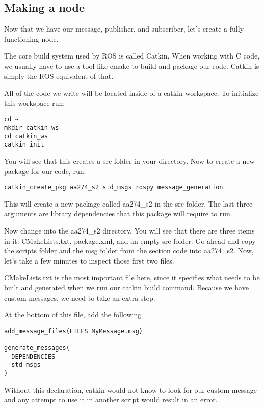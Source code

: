 
\subsection{Making a node}
Now that we have our message, publisher, and subscriber, let's create a fully functioning node.

The core build system used by ROS is called Catkin. When working with C code, we usually have to use a tool like cmake to build and package our code. Catkin is simply the ROS equivalent of that. 

All of the code we write will be located inside of a catkin workspace. To initialize this workspace run:

\begin{lstlisting}
cd ~
mkdir catkin_ws 
cd catkin_ws
catkin init
\end{lstlisting}
You will see that this creates a src folder in your directory. Now to create a new package for our code, run:

\begin{lstlisting}
catkin_create_pkg aa274_s2 std_msgs rospy message_generation
\end{lstlisting}

This will create a new package called aa274\_s2 in the src folder. The last three arguments are library dependencies that this package will require to run.

Now change into the aa274\_s2 directory. You will see that there are three items in it: CMakeLists.txt, package.xml, and an empty src folder. Go ahead and copy the scripts folder and the msg folder from the section code into aa274\_s2. Now, let's take a few minutes to inspect those first two files.

CMakeLists.txt is the most important file here, since it specifies what needs to be built and generated when we run our catkin build command. Because we have custom messages, we need to take an extra step.

At the bottom of this file, add the following

\begin{lstlisting}
add_message_files(FILES MyMessage.msg)

generate_messages(
  DEPENDENCIES
  std_msgs
)
\end{lstlisting}

Without this declaration, catkin would not know to look for our custom message and any attempt to use it in another script would result in an error.

